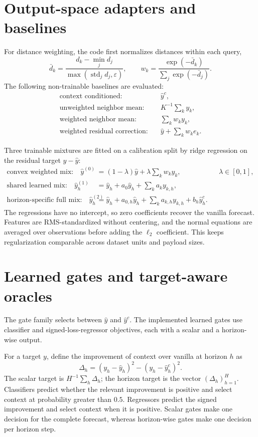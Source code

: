 \documentclass[11pt]{article}
\begin{document}
\section{Output-space adapters and baselines}

For distance weighting, the code first normalizes distances within each query,
\[
  \bar d_k=\frac{d_k-\min_j d_j}{\max(\operatorname{std}_j d_j,\varepsilon)},
  \qquad
  w_k=\frac{\exp(-\bar d_k)}{\sum_j\exp(-\bar d_j)}.
\]
The following non-trainable baselines are evaluated:
\begin{align*}
\text{context conditioned:}\quad &\hat y^c,\\
\text{unweighted neighbor mean:}\quad &K^{-1}\sum_k y_k,\\
\text{weighted neighbor mean:}\quad &\sum_k w_k y_k,\\
\text{weighted residual correction:}\quad
  &\hat y+\sum_k w_k e_k.
\end{align*}

Three trainable mixtures are fitted on a calibration split by ridge regression
on the residual target $y-\hat y$:
\begin{align*}
\text{convex weighted mix:}\quad
  \hat y^{(0)}
  &=(1-\lambda)\hat y+\lambda\sum_k w_k y_k,
  &&\lambda\in[0,1],\\
\text{shared learned mix:}\quad
  \hat y^{(1)}_h
  &=\hat y_h+a_0\hat y_h+\sum_k a_k y_{k,h},\\
\text{horizon-specific full mix:}\quad
  \hat y^{(2)}_h
  &=\hat y_h+a_{0,h}\hat y_h+
    \sum_k a_{k,h}y_{k,h}+b_h\hat y^c_h.
\end{align*}
The regressions have no intercept, so zero coefficients recover the vanilla
forecast.  Features are RMS-standardized without centering, and the normal
equations are averaged over observations before adding the $\ell_2$
coefficient.  This keeps regularization comparable across dataset units and
payload sizes.

\section{Learned gates and target-aware oracles}
\label{sec:gates}

The gate family selects between $\hat y$ and $\hat y^c$.  The implemented
learned gates use classifier and signed-loss-regressor objectives, each with a
scalar and a horizon-wise output.

For a target $y$, define the improvement of context over vanilla at horizon $h$
as
\[
  \Delta_h=(y_h-\hat y_h)^2-(y_h-\hat y^c_h)^2.
\]
The scalar target is $H^{-1}\sum_h\Delta_h$; the horizon target is the vector
$(\Delta_h)_{h=1}^{H}$.  Classifiers predict whether the relevant improvement
is positive and select context at probability greater than $0.5$.  Regressors
predict the signed improvement and select context when it is positive.
Scalar gates make one decision for the complete forecast, whereas horizon-wise
gates make one decision per horizon step.
\end{document}
